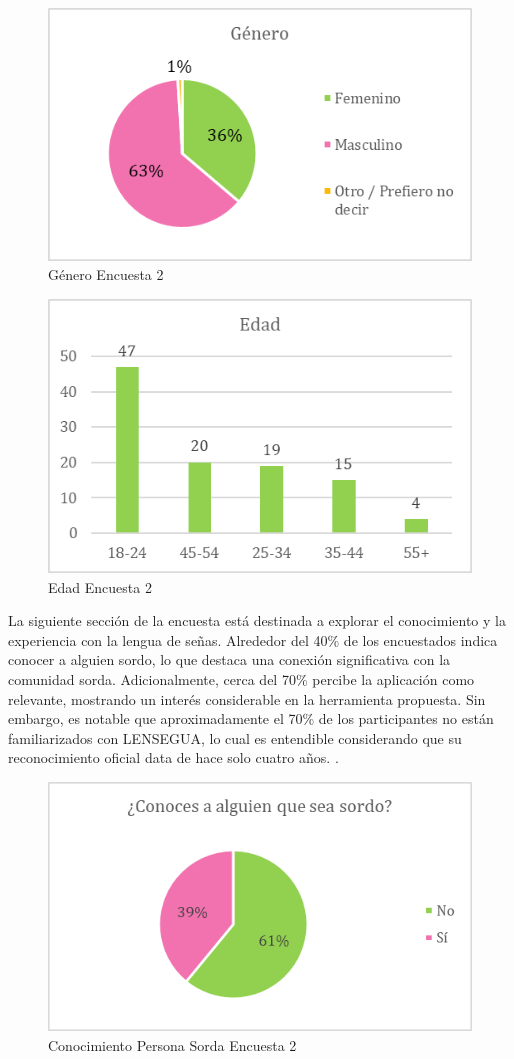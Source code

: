 \begin{figure} [H]
    \centering
    \includegraphics[width=0.5\linewidth]{figuras/encuesta_genero.png}
    \caption{Género Encuesta 2}
    \label{fig:enter-label}
\end{figure}

\begin{figure} [H]
    \centering
    \includegraphics[width=0.5\linewidth]{figuras/encuesta_edad.png}
    \caption{Edad Encuesta 2}
    \label{fig:enter-label}
\end{figure}

La siguiente sección de la encuesta está destinada a explorar el conocimiento y la experiencia con la lengua de señas. Alrededor del 40\% de los encuestados indica conocer a alguien sordo, lo que destaca una conexión significativa con la comunidad sorda. Adicionalmente, cerca del 70\% percibe la aplicación como relevante, mostrando un interés considerable en la herramienta propuesta. Sin embargo, es notable que aproximadamente el 70\% de los participantes no están familiarizados con LENSEGUA, lo cual es entendible considerando que su reconocimiento oficial data de hace solo cuatro años. \cite{CongresoGuatemala2020}. 

\begin{figure} [H]
    \centering
    \includegraphics[width=0.5\linewidth]{figuras/conocimientoSordaEncuesta.png}
    \caption{Conocimiento Persona Sorda Encuesta 2}
    \label{fig:enter-label}
\end{figure}

